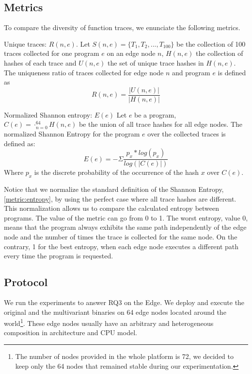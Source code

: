 \subsection{Metrics}

To compare the diversity of function traces, we enunciate the following metrics.  


\begin{metric}{Unique traces: $R(n, e)$.}\label{metric:ratio:mve}
    Let $S(n, e)=\{T_1, T_2, ..., T_{100}\}$ be the collection of 100 traces collected for one program $e$ on an edge node $n$, $H(n, e)$ the collection of hashes of each trace and $U(n, e)$ the set of unique trace hashes in $H(n,e)$.
    The uniqueness ratio of traces collected for edge node $n$ and program $e$ is defined as
    $$
        R(n,e) = \frac{|U(n,e)|}{|H(n, e)|}
    $$
\end{metric}


\begin{metric}{Normalized Shannon entropy: $E(e)$}\label{metric:entropy}
    Let $e$ be a program, $C(e)=\cdot_{n=0}^{64} H(n, e)$ be the union  of all trace hashes for all edge nodes.
    The normalized Shannon Entropy for the program $e$ over the collected traces is defined as: \\
    $$
        E(e)=-\Sigma \frac{p_x*log(p_x)}{log(|C(e)|)}
    $$
    Where $p_x$ is the discrete probability of the occurrence of the hash $x$ over $C(e)$.
    
\end{metric}

Notice that we normalize the standard definition of the Shannon Entropy, \autoref{metric:entropy}, by using the perfect case where all trace hashes are different. 
This normalization allows us to compare the calculated entropy between programs.
The value of the metric can go from 0 to 1. The worst entropy, value 0, means that the program always exhibits the same path independently of the edge node and the number of times the trace is collected for the same node. On the contrary, 1 for the best entropy, when each edge node executes a different path every time the program is requested.

\subsection{Protocol}


We run the experiments to answer RQ3 on the Edge. We deploy and execute the original and the multivariant binaries on 64 edge nodes located around the world\footnote{The number of nodes provided in the whole platform is 72, we decided to keep only the 64 nodes that remained stable during our experimentation.}.
These edge nodes usually have an arbitrary and heterogeneous composition in architecture and CPU model.


